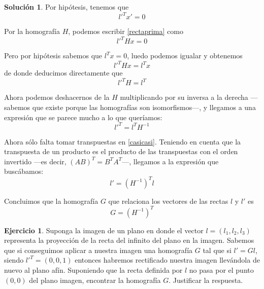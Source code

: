 \documentclass[a4paper, 11pt]{article}
\theoremstyle{definition}
\newtheorem{ejercicio}{Ejercicio}
\newtheorem*{solucion}{Solución}
\theoremstyle{theorem}
\begin{document}
  \begin{solucion}
      Por hipótesis, tenemos que
      \begin{equation}
          l'^Tx'=0 \label{rectaprima}
      \end{equation}

      Por la homografía $H$, podemos escribir \ref{rectaprima} como
      \begin{equation}
          l'^THx=0 \label{rectah}
      \end{equation}

      Pero por hipótesis sabemos que $l^Tx = 0$, luedo podemos igualar y obtenemos
      \begin{equation}
          l'^THx = l^Tx
      \end{equation}
      de donde deducimos directamente que
      \begin{equation}
          l'^TH = l^T \label{casi}
      \end{equation}

      Ahora podemos deshacernos de la $H$ multiplicando por su inversa a la derecha ---sabemos que existe porque las homografías son isomorfismos---, y llegamos a una expresión que se parece mucho a lo que queríamos:
      \begin{equation}
          l'^T = l^TH^{-1} \label{casicasi}
      \end{equation}

      Ahora sólo falta tomar transpuestas en \ref{casicasi}. Teniendo en cuenta que la transpuesta de un producto es el producto de las transpuestas con el orden invertido ---es decir, $(AB)^T = B^TA^T$---, llegamos a la expresión que buscábamos:
      \begin{equation}
          l' = (H^{-1})^Tl
      \end{equation}

      Concluimos que la homografía $G$ que relaciona los vectores de las rectas $l$ y $l'$ es
      \[
      G = (H^{-1})^T
      \]
  \end{solucion}

  \begin{ejercicio}
      Suponga la imagen de un plano en donde el vector $l=(l_1,l_2,l_3)$ representa la proyección de la recta del infinito del plano en la imagen. Sabemos que si conseguimos aplicar a nuestra imagen una homografía $G$ tal que si $l'= Gl$, siendo $l'^T =(0,0,1)$ entonces habremos rectificado nuestra imagen llevándola de nuevo al plano afín. Suponiendo que la recta definida por $l$ no pasa por el punto $(0,0)$ del plano imagen, encontrar la homografía $G$. Justificar la respuesta.
  \end{ejercicio}
\end{document}
